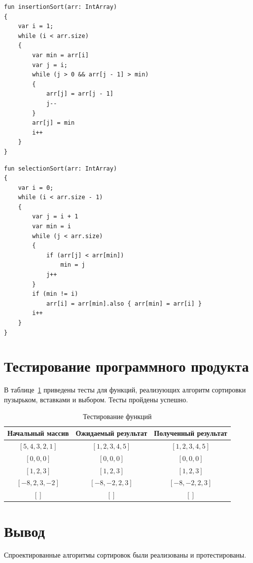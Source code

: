 \documentclass[12pt]{report}
\begin{document}
\begin{lstlisting}[caption=Функция реализации алгоритма сортировки вставками,
label={list:insertionSort}]
fun insertionSort(arr: IntArray)
{
    var i = 1;
    while (i < arr.size)
    {
        var min = arr[i]
        var j = i;
        while (j > 0 && arr[j - 1] > min)
        {
            arr[j] = arr[j - 1]
            j--
        }
        arr[j] = min
        i++
    }
}
\end{lstlisting}

\begin{lstlisting}[caption=Функция реализации алгоритма сортировки выбором,
label={list:selectionSort}]
fun selectionSort(arr: IntArray)
{
    var i = 0;
    while (i < arr.size - 1)
    {
        var j = i + 1
        var min = i
        while (j < arr.size)
        {
            if (arr[j] < arr[min])
                min = j
            j++
        }
        if (min != i)
            arr[i] = arr[min].also { arr[min] = arr[i] }
        i++
    }
}
\end{lstlisting}

\section{Тестирование программного продукта}
В таблице~\ref{tests} приведены тесты для функций, реализующих алгоритм сортировки пузырьком, вставками и выбором. Тесты пройдены успешно.

\begin{table}[h!]
	\begin{center}
		\begin{tabular}{|c|c|c|}
			\hline
			Начальный массив & Ожидаемый результат & Полученный результат \\ 
			\hline
			$[5, 4, 3, 2, 1]$ & $[1, 2, 3, 4, 5]$  & $[1, 2, 3, 4, 5]$\\
			$[0, 0, 0]$  & $[0, 0, 0]$  & $[0, 0, 0]$\\
			$[1, 2, 3]$ & $[1, 2, 3]$ & $[1, 2, 3]$\\
			$[-8, 2, 3, -2]$ & $[-8, -2, 2, 3]$ & $[-8, -2, 2, 3]$\\
			$[]$  & $[]$  & $[]$\\
			\hline
		\end{tabular}
		\caption{\label{tests}Тестирование функций}
	\end{center}
\end{table}
\section*{Вывод}
Спроектированные алгоритмы сортировок были реализованы и протестированы.
\end{document}
